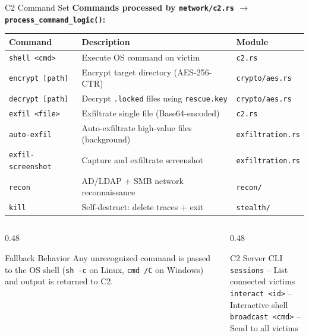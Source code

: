 \documentclass[aspectratio=169]{beamer}
\newcommand{\code}[1]{\texttt{\textcolor{primaryblue}{#1}}}
\begin{document}
\begin{frame}{C2 Command Set}
  \textbf{Commands processed by \code{network/c2.rs} $\rightarrow$ \code{process\_command\_logic()}:}

  \vspace{0.5em}
  \footnotesize
  \begin{tabular}{lll}
    \toprule
    \textbf{Command} & \textbf{Description} & \textbf{Module} \\
    \midrule
    \code{shell <cmd>} & Execute OS command on victim & \code{c2.rs} \\
    \code{encrypt [path]} & Encrypt target directory (AES-256-CTR) & \code{crypto/aes.rs} \\
    \code{decrypt [path]} & Decrypt \code{.locked} files using \code{rescue.key} & \code{crypto/aes.rs} \\
    \code{exfil <file>} & Exfiltrate single file (Base64-encoded) & \code{c2.rs} \\
    \code{auto-exfil} & Auto-exfiltrate high-value files (background) & \code{exfiltration.rs} \\
    \code{exfil-screenshot} & Capture and exfiltrate screenshot & \code{exfiltration.rs} \\
    \code{recon} & AD/LDAP + SMB network reconnaissance & \code{recon/} \\
    \code{kill} & Self-destruct: delete traces + exit & \code{stealth/} \\
    \bottomrule
  \end{tabular}

  \vspace{0.5em}
  \begin{columns}[T]
    \begin{column}{0.48\textwidth}
      \begin{infobox}{Fallback Behavior}
        Any unrecognized command is passed to the OS shell (\code{sh -c} on Linux, \code{cmd /C} on Windows) and output is returned to C2.
      \end{infobox}
    \end{column}
    \begin{column}{0.48\textwidth}
      \begin{codebox}{C2 Server CLI}
        \code{sessions} -- List connected victims\\
        \code{interact <id>} -- Interactive shell\\
        \code{broadcast <cmd>} -- Send to all victims
      \end{codebox}
    \end{column}
  \end{columns}
\end{frame}
\end{document}
